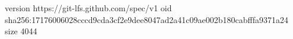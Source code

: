 version https://git-lfs.github.com/spec/v1
oid sha256:17176006028cccd9cda3cf2e9dee8047ad2a41c09ae002b180cabfffa9371a24
size 4044

